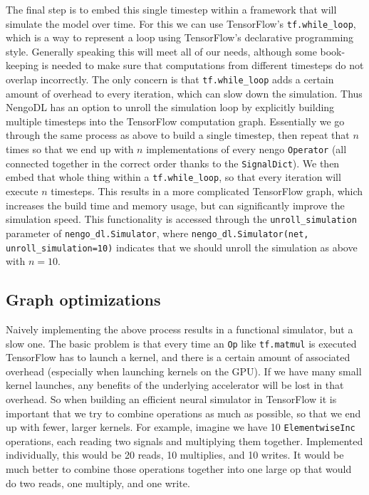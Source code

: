 \documentclass{article}
\begin{document}
The final step is to embed this single timestep within a framework that will simulate the model over time.  For this we can use TensorFlow's \texttt{tf.while\_loop}, which is a way to represent a loop using TensorFlow's declarative programming style.  Generally speaking this will meet all of our needs, although some book-keeping is needed to make sure that computations from different timesteps do not overlap incorrectly.  The only concern is that \texttt{tf.while\_loop} adds a certain amount of overhead to every iteration, which can slow down the simulation.  Thus NengoDL has an option to unroll the simulation loop by explicitly building multiple timesteps into the TensorFlow computation graph.  Essentially we go through the same process as above to build a single timestep, then repeat that $n$ times so that we end up with $n$ implementations of every nengo \texttt{Operator} (all connected together in the correct order thanks to the \texttt{SignalDict}).  We then embed that whole thing within a \texttt{tf.while\_loop}, so that every iteration will execute $n$ timesteps.  This results in a more complicated TensorFlow graph, which increases the build time and memory usage, but can significantly improve the simulation speed.  This functionality is accessed through the \texttt{unroll\_simulation} parameter of \texttt{nengo\_dl.Simulator}, where \texttt{nengo\_dl.Simulator(net, unroll\_simulation=10)} indicates that we should unroll the simulation as above with $n=10$.

\subsection{Graph optimizations}
\label{sec:graphoptimizations}

Naively implementing the above process results in a functional simulator, but a slow one.  The basic problem is that every time an \texttt{Op} like \texttt{tf.matmul} is executed TensorFlow has to launch a kernel, and there is a certain amount of associated overhead (especially when launching kernels on the GPU).  If we have many small kernel launches, any benefits of the underlying accelerator will be lost in that overhead.  So when building an efficient neural simulator in TensorFlow it is important that we try to combine operations as much as possible, so that we end up with fewer, larger kernels.  For example, imagine we have 10 \texttt{ElementwiseInc} operations, each reading two signals and multiplying them together.  Implemented individually, this would be 20 reads, 10 multiplies, and 10 writes.  It would be much better to combine those operations together into one large op that would do two reads, one multiply, and one write.
\end{document}
